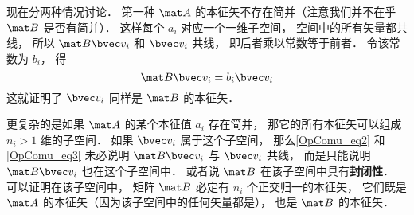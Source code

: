 现在分两种情况讨论． 第一种 $\mat A$ 的本征矢不存在简并（注意我们并不在乎 $\mat B$ 是否有简并）． 这样每个 $a_i$ 对应一个一维子空间， 空间中的所有矢量都共线， 所以 $\mat B \bvec v_i$ 和 $\bvec v_i$ 共线， 即后者乘以常数等于前者． 令该常数为 $b_i$， 得
\begin{equation}
\mat B \bvec v_i = b_i \bvec v_i
\end{equation}
这就证明了 $\bvec v_i$ 同样是 $\mat B$ 的本征矢．

更复杂的是如果 $\mat A$ 的某个本征值 $a_i$ 存在简并， 那它的所有本征矢可以组成 $n_i > 1$ 维的子空间． 如果 $\bvec v_i$ 属于这个子空间， 那么\autoref{OpComu_eq2} 和\autoref{OpComu_eq3} 未必说明 $\mat B \bvec v_i$ 与 $\bvec v_i$ 共线， 而是只能说明 $\mat B \bvec v_i$ 也在这个子空间中． 或者说 $\mat B$ 在该子空间中具有\textbf{封闭性}． 可以证明在该子空间中， 矩阵 $\mat B$ 必定有 $n_i$ 个正交归一的本征矢， 它们既是 $\mat A$ 的本征矢（因为该子空间中的任何矢量都是）， 也是 $\mat B$ 的本征矢．

